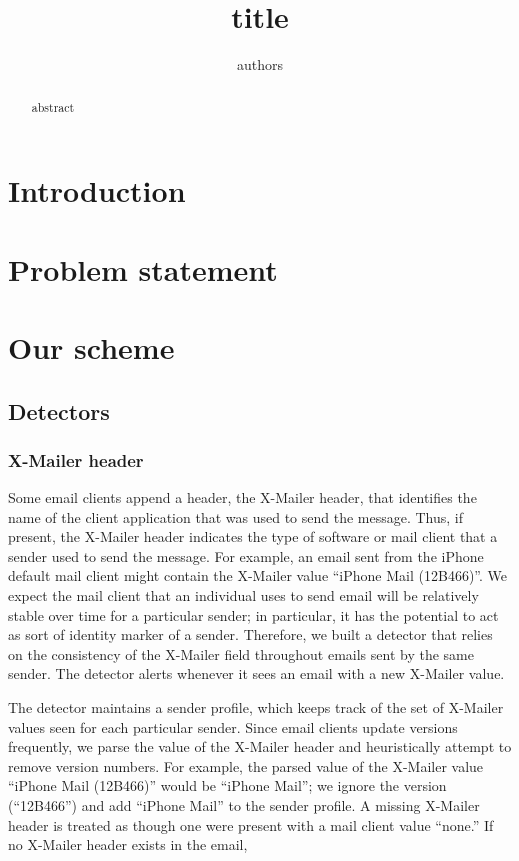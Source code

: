 \documentclass[letterpaper]{article}
\begin{document}
\title{title}
\author{authors}
\maketitle

\begin{abstract}
abstract
\end{abstract}

\section{Introduction}
\section{Problem statement}
\section{Our scheme}

\subsection{Detectors}
\subsubsection{X-Mailer header}

Some email clients append a header, the X-Mailer header, that identifies the name of the client application that was used to send the message.
Thus, if present, the X-Mailer header indicates the type of software or mail client that a sender used to send the message.
For example, an email sent from the iPhone default mail client might contain the X-Mailer value ``iPhone Mail (12B466)''.
We expect the mail client that an individual uses to send email will be
relatively stable over time for a particular sender; in particular, it has the potential to act as sort of identity marker of a sender.
Therefore, we built a detector that relies on the consistency of the X-Mailer field throughout emails sent by the same sender.
The detector alerts whenever it sees an email with a new X-Mailer value.

The detector maintains a sender profile, which keeps track of the set of X-Mailer values seen for each particular sender.
Since email clients update versions frequently, we parse the value of the X-Mailer header and heuristically attempt to remove version numbers.
For example, the parsed value of the X-Mailer value ``iPhone Mail (12B466)'' would be ``iPhone Mail'';
we ignore the version (``12B466'') and add ``iPhone Mail'' to the sender profile.
A missing X-Mailer header is treated as though one were present with a mail client value ``none.''
If no X-Mailer header exists in the email, 
\end{document}
